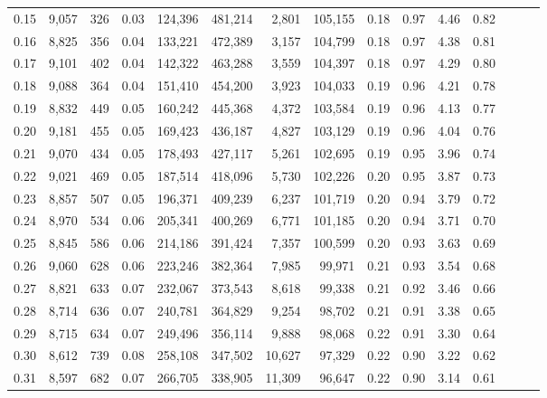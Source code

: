 \begin{tabular}{rrrrrrrrrrrrrrr}
0.15 &  9,057 &    326 &  0.03 &  124,396 &  481,214 &    2,801 &  105,155 &  0.18 &  0.97 &  4.46 &      0.82 \\
0.16 &  8,825 &    356 &  0.04 &  133,221 &  472,389 &    3,157 &  104,799 &  0.18 &  0.97 &  4.38 &      0.81 \\
0.17 &  9,101 &    402 &  0.04 &  142,322 &  463,288 &    3,559 &  104,397 &  0.18 &  0.97 &  4.29 &      0.80 \\
0.18 &  9,088 &    364 &  0.04 &  151,410 &  454,200 &    3,923 &  104,033 &  0.19 &  0.96 &  4.21 &      0.78 \\
0.19 &  8,832 &    449 &  0.05 &  160,242 &  445,368 &    4,372 &  103,584 &  0.19 &  0.96 &  4.13 &      0.77 \\
0.20 &  9,181 &    455 &  0.05 &  169,423 &  436,187 &    4,827 &  103,129 &  0.19 &  0.96 &  4.04 &      0.76 \\
0.21 &  9,070 &    434 &  0.05 &  178,493 &  427,117 &    5,261 &  102,695 &  0.19 &  0.95 &  3.96 &      0.74 \\
0.22 &  9,021 &    469 &  0.05 &  187,514 &  418,096 &    5,730 &  102,226 &  0.20 &  0.95 &  3.87 &      0.73 \\
0.23 &  8,857 &    507 &  0.05 &  196,371 &  409,239 &    6,237 &  101,719 &  0.20 &  0.94 &  3.79 &      0.72 \\
0.24 &  8,970 &    534 &  0.06 &  205,341 &  400,269 &    6,771 &  101,185 &  0.20 &  0.94 &  3.71 &      0.70 \\
0.25 &  8,845 &    586 &  0.06 &  214,186 &  391,424 &    7,357 &  100,599 &  0.20 &  0.93 &  3.63 &      0.69 \\
0.26 &  9,060 &    628 &  0.06 &  223,246 &  382,364 &    7,985 &   99,971 &  0.21 &  0.93 &  3.54 &      0.68 \\
0.27 &  8,821 &    633 &  0.07 &  232,067 &  373,543 &    8,618 &   99,338 &  0.21 &  0.92 &  3.46 &      0.66 \\
0.28 &  8,714 &    636 &  0.07 &  240,781 &  364,829 &    9,254 &   98,702 &  0.21 &  0.91 &  3.38 &      0.65 \\
0.29 &  8,715 &    634 &  0.07 &  249,496 &  356,114 &    9,888 &   98,068 &  0.22 &  0.91 &  3.30 &      0.64 \\
0.30 &  8,612 &    739 &  0.08 &  258,108 &  347,502 &   10,627 &   97,329 &  0.22 &  0.90 &  3.22 &      0.62 \\
0.31 &  8,597 &    682 &  0.07 &  266,705 &  338,905 &   11,309 &   96,647 &  0.22 &  0.90 &  3.14 &      0.61 \\

\end{tabular}
